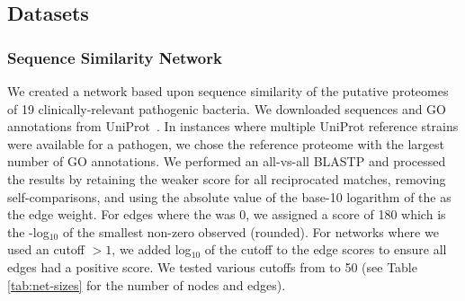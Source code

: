 \subsection{Datasets}
\label{sec:datasets}

\subsubsection{Sequence Similarity Network}
\label{sec:ssn}
We created a network based upon sequence similarity of the putative proteomes of 19 clinically-relevant pathogenic bacteria.
We downloaded sequences and GO annotations from UniProt~\cite{uniprot-consortium-uniprot-nar-2017}.
In instances where multiple UniProt reference strains were available for a pathogen, we chose the reference proteome with the largest number of GO annotations.
We performed an all-vs-all BLASTP and processed the results by 
retaining the weaker score for all reciprocated matches, removing self-comparisons, and using the absolute value of the base-10 logarithm of the \eval as the edge weight. 
For edges where the \eval was 0, we assigned a score of 180 which is the -log$_{10}$ of the smallest non-zero \eval observed (rounded).
For networks where we used an \eval cutoff $> 1$, we added log$_{10}$ of the cutoff to the edge scores to ensure all edges had a positive score.
We tested various \eval cutoffs from  to 50 (see Table \ref{tab:net-sizes} for the number of nodes and edges).

